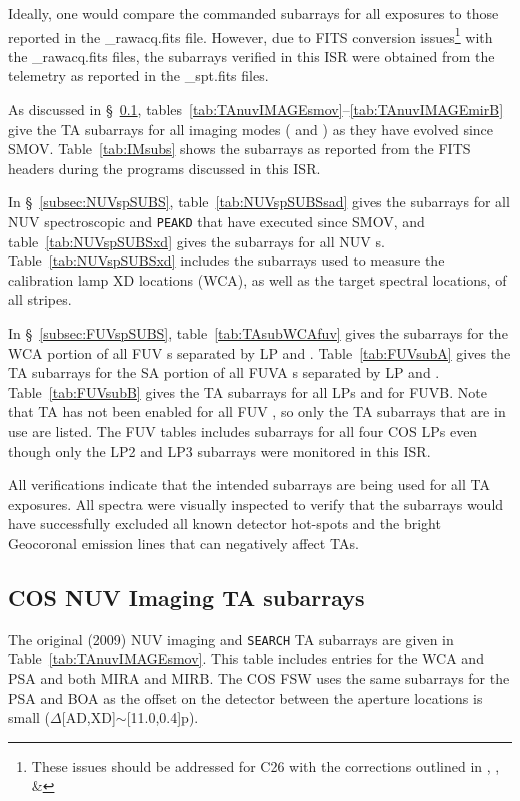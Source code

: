 Ideally, one would compare the commanded subarrays for all exposures to those reported in the {\sf \_rawacq.fits} file.
However, due to FITS conversion issues\footnote{These issues should be addressed for C26 with the corrections outlined in , , \& } with the {\sf \_rawacq.fits} files,
the subarrays verified in this ISR were obtained from the telemetry as reported in the {\sf \_spt.fits} files.

As discussed in \S~\ref{subsec:NUVimSUBS}, tables~\ref{tab:TAnuvIMAGEsmov}--\ref{tab:TAnuvIMAGEmirB} give the TA subarrays for all imaging modes
( and ) as they have evolved since SMOV.
Table~\ref{tab:IMsubs} shows the  subarrays as reported from the FITS headers during the programs discussed in this ISR.

In \S~\ref{subsec:NUVspSUBS}, table~\ref{tab:NUVspSUBSsad} gives the subarrays for all NUV spectroscopic  and \texttt{PEAKD} that have executed since SMOV,
and table~\ref{tab:NUVspSUBSxd} gives the subarrays for all NUV s. Table~\ref{tab:NUVspSUBSxd} includes the subarrays used to measure the
calibration lamp XD locations (WCA), as well as the target spectral locations, of all stripes.

In \S~\ref{subsec:FUVspSUBS}, table~\ref{tab:TAsubWCAfuv} gives the subarrays for the WCA portion of all FUV s separated by LP and \cenwave{}.
Table~\ref{tab:FUVsubA} gives the TA subarrays for the SA portion of all FUVA \tacq{}s separated by LP and \cenwave{}.
Table~\ref{tab:FUVsubB} gives the TA subarrays for all LPs and \cenwaves{} for FUVB.
Note that TA has not been enabled for all FUV \cenwaves{}, so only the TA subarrays that are in use are listed.
The FUV tables includes subarrays for all four COS LPs even though only the LP2 and LP3 subarrays were monitored in this ISR.

All verifications indicate that the intended subarrays are being used for all TA exposures. All spectra were visually
inspected to verify that the subarrays would have successfully excluded all known detector hot-spots and the
bright Geocoronal emission lines that can negatively affect TAs.
\subsection{COS NUV Imaging TA subarrays}\label{subsec:NUVimSUBS}
The original (2009) NUV imaging  and \texttt{SEARCH} TA subarrays are given in Table~\ref{tab:TAnuvIMAGEsmov}.
This table includes entries for the WCA and PSA and both MIRA and MIRB.
The COS FSW uses the same subarrays for the PSA and BOA as the offset on the detector between the aperture locations is small ($\Delta$[AD,XD]$\sim$[11.0,0.4]p).

